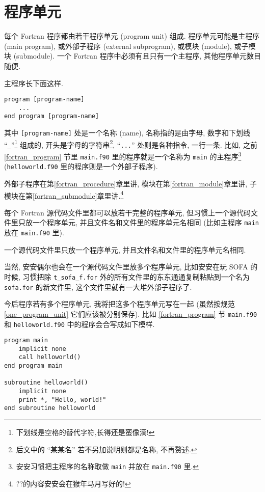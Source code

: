 \section{程序单元}\label{program_unit}

每个 Fortran 程序都由若干程序单元 (program unit) 组成. 程序单元可能是主程序 (main program), 或外部子程序 (external subprogram), 或模块 (module), 或子模块 (submodule). 一个 Fortran 程序中必须有且只有一个主程序, 其他程序单元数目随便.

主程序长下面这样.
\begin{lstlisting}
program [program-name]
    ...
end program [program-name]
\end{lstlisting}
其中 \texttt{[program-name]} 处是一个名称 (name), 名称指的是由字母, 数字和下划线 ``\texttt{\_{}}''\footnote{
    下划线是空格的替代字符,长得还是蛮像滴!
} 组成的, 开头是字母的字符串\footnote{后文中的 ``某某名'' 若不另加说明则都是名称, 不再赘述.}, ``\texttt{...}'' 处则是各种指令, 一行一条. 比如, 之前 \ref{fortran_program} 节里 \texttt{main.f90} 里的程序就是一个名称为 \texttt{main} 的主程序\footnote{安安习惯把主程序的名称取做 \texttt{main} 并放在 \texttt{main.f90} 里.} \\(\texttt{helloworld.f90} 里的程序则是一个外部子程序).

外部子程序在第\ref{fortran_procedure}章里讲, 模块在第\ref{fortran_module}章里讲, 子模块在第\ref{fortran_submodule}章里讲.\footnote{??\mbox{}的内容安安会在猴年马月写好的!}

每个 Fortran 源代码文件里都可以放若干完整的程序单元, 但习惯上一个源代码文件里只放一个程序单元, 并且文件名和文件里的程序单元名相同 (比如主程序 \texttt{main} 放在 \texttt{main.f90} 里).
\begin{convention}
    一个源代码文件里只放一个程序单元, 并且文件名和文件里的程序单元名相同.\label{one_program_unit}
\end{convention}
当然, 安安偶尔也会在一个源代码文件里放多个程序单元, 比如安安在玩 SOFA 的时候, 习惯把除 \texttt{t\_{}sofa\_{}f.for} 外的所有文件里的东东通通复制粘贴到一个名为 \texttt{sofa.for} 的新文件里, 这个文件里就有一大堆外部子程序了.

今后程序若有多个程序单元, 我将把这多个程序单元写在一起 (虽然按规范 \ref{one_program_unit} 它们应该被分别保存). 比如 \ref{fortran_program} 节 \texttt{main.f90} 和 \texttt{helloworld.f90} 中的程序会合写成如下模样.
\begin{lstlisting}
program main
    implicit none
    call helloworld()
end program main

subroutine helloworld()
    implicit none
    print *, "Hello, world!"
end subroutine helloworld
\end{lstlisting}

